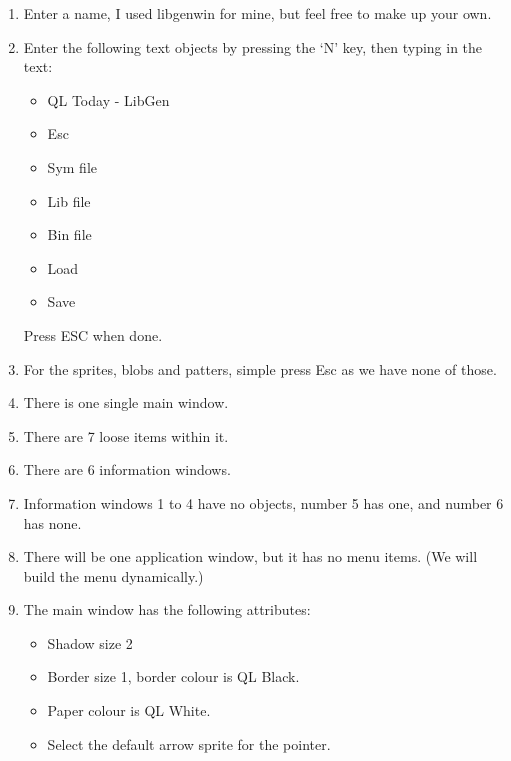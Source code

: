 \begin{enumerate}
\item{Enter a name, I used libgenwin for mine, but feel free to make
        up your own.
}
\item{Enter the following text objects by pressing the `N' key, then
        typing in the text:
\begin{itemize}[itemsep=0pt]

\item{}QL Today -{} LibGen


\item{}Esc


\item{}Sym file


\item{}Lib file


\item{}Bin file


\item{}Load


\item{}Save

\end{itemize}

Press ESC when done.
}
\item{For the sprites, blobs and patters, simple press Esc as we have
        none of those.
}
\item{There is one single main window.
}
\item{There are 7 loose items within it.
}
\item{There are 6 information windows.
}
\item{Information windows 1 to 4 have no objects, number 5 has one,
        and number 6 has none.
}
\item{There will be one application window, but it has no menu items.
        (We will build the menu dynamically.)
}
\item{The main window has the following attributes:
\begin{itemize}[itemsep=0pt]

\item{}Shadow size 2


\item{}Border size 1, border colour is QL Black.


\item{}Paper colour is QL White.


\item{}Select the default arrow sprite for the pointer.


\end{itemize}}
\end{enumerate}
